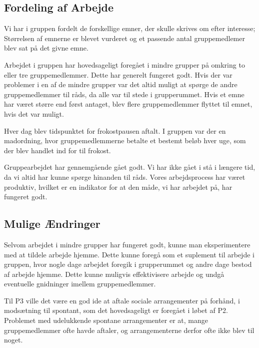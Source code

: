 \subsection{Fordeling af Arbejde}

Vi har i gruppen fordelt de forskellige emner, der skulle skrives om efter interesse; St\o{}rrelsen af emnerne er blevet vurderet og et passende antal gruppemedlemer blev sat p\aa{} det givne emne.

Arbejdet i gruppen har hovedsageligt foreg\aa{}et i mindre grupper p\aa{} omkring to eller tre gruppemedlemmer. Dette har generelt fungeret godt. 
Hvis der var problemer i en af de mindre grupper var det altid muligt at sp\o{}rge de andre gruppemedlemmer til r\aa{}ds, da alle var til stede i grupperummet.
Hvis et emne har v\ae{}ret st\o{}rre end f\o{}rst antaget, blev flere gruppemedlemmer flyttet til emnet, hvis det var muligt.

Hver dag blev tidspunktet for frokostpausen aftalt. I gruppen var der en madordning, hvor gruppemedlemmerne betalte et bestemt bel\o{}b hver uge, som der blev handlet ind for til frokost. 

Gruppearbejdet har gennemg\aa{}ende g\aa{}et godt. Vi har ikke g\aa{}et i st\aa{} i l\ae{}ngere tid, da vi altid har kunne sp\o{}rge hinanden til r\aa{}ds. Vores arbejdsprocess har v\ae{}ret produktiv, hvilket er en indikator for at den m\aa{}de, vi har arbejdet p\aa{}, har fungeret godt.

\subsection{Mulige \AE{}ndringer}

Selvom arbejdet i mindre grupper har fungeret godt, kunne man eksperimentere med at tildele arbejde hjemme. Dette kunne foreg\aa{} som et suplement til arbejde i gruppen, hvor nogle dage arbejdet foregik i grupperummet og andre dage bestod af arbejde hjemme.
Dette kunne muligvis effektivisere arbejde og undg\aa{} eventuelle gnidninger imellem gruppemedlemmer.

Til P3 ville det v\ae{}re en god ide at aftale sociale arrangementer p\aa{} forh\aa{}nd, i mods\ae{}tning til spontant, som det hovedsageligt er foreg\aa{}et i l\o{}bet af P2. 
Problemet med udelukkende spontane arrangementer er at, mange gruppemedlemmer ofte havde aftaler, og arrangementerne derfor ofte ikke blev til noget.